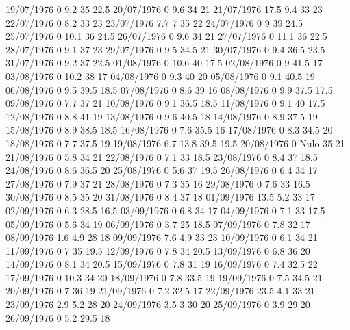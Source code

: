 19/07/1976  0      9.2    35     22.5 
20/07/1976  0      9.6    34     21 
21/07/1976  17.5   9.4    33     23 
22/07/1976  0      8.2    33     23 
23/07/1976  7.7    7      35     22 
24/07/1976  0      9      39     24.5 
25/07/1976  0      10.1   36     24.5 
26/07/1976  0      9.6    34     21 
27/07/1976  0      11.1   36     22.5 
28/07/1976  0      9.1    37     23 
29/07/1976  0      9.5    34.5   21 
30/07/1976  0      9.4    36.5   23.5 
31/07/1976  0      9.2    37     22.5 
01/08/1976  0      10.6   40     17.5 
02/08/1976  0      9      41.5   17 
03/08/1976  0      10.2   38     17 
04/08/1976  0      9.3    40     20 
05/08/1976  0      9.1    40.5   19 
06/08/1976  0      9.5    39.5   18.5 
07/08/1976  0      8.6    39     16 
08/08/1976  0      9.9    37.5   17.5 
09/08/1976  0      7.7    37     21 
10/08/1976  0      9.1    36.5   18.5 
11/08/1976  0      9.1    40     17.5 
12/08/1976  0      8.8    41     19 
13/08/1976  0      9.6    40.5   18 
14/08/1976  0      8.9    37.5   19 
15/08/1976  0      8.9    38.5   18.5 
16/08/1976  0      7.6    35.5   16 
17/08/1976  0      8.3    34.5   20 
18/08/1976  0      7.7    37.5   19 
19/08/1976  6.7    13.8   39.5   19.5 
20/08/1976  0     Nulo    35     21 
21/08/1976  0      5.8    34     21 
22/08/1976  0      7.1    33     18.5 
23/08/1976  0      8.4    37     18.5 
24/08/1976  0      8.6    36.5   20 
25/08/1976  0      5.6    37     19.5 
26/08/1976  0      6.4    34     17 
27/08/1976  0      7.9    37     21 
28/08/1976  0      7.3    35     16 
29/08/1976  0      7.6    33     16.5 
30/08/1976  0      8.5    35     20 
31/08/1976  0      8.4    37     18 
01/09/1976  13.5   5.2    33     17 
02/09/1976  0      6.3    28.5   16.5 
03/09/1976  0      6.8    34     17 
04/09/1976  0      7.1    33     17.5 
05/09/1976  0      5.6    34     19 
06/09/1976  0      3.7    25     18.5 
07/09/1976  0      7.8    32     17 
08/09/1976  1.6    4.9    28     18 
09/09/1976  7.6    4.9    33     23 
10/09/1976  0      6.1    34     21 
11/09/1976  0      7      35     19.5 
12/09/1976  0      7.8    34     20.5 
13/09/1976  0      6.8    36     20 
14/09/1976  0      8.1    34     20.5 
15/09/1976  0      7.8    31     19 
16/09/1976  0      7.4    32.5   22 
17/09/1976  0      10.3   34     20 
18/09/1976  0      7.8    33.5   19 
19/09/1976  0      7.5    34.5   21 
20/09/1976  0      7      36     19 
21/09/1976  0      7.2    32.5   17 
22/09/1976  23.5   4.1    33     21 
23/09/1976  2.9    5.2    28     20 
24/09/1976  3.5    3      30     20 
25/09/1976  0      3.9    29     20 
26/09/1976  0      5.2    29.5   18 
